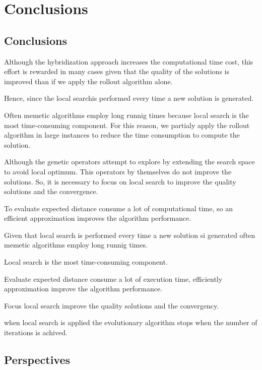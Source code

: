 \chapter{Conclusions}
\label{chap:conclusions}

\section{Conclusions}

Although the hybridization approach increases the computational time cost, this effort is rewarded in many cases given that the quality of the solutions is improved than if we apply the rollout algorithm alone. 

Hence, since the local searchis performed every time a new solution is generated.

Often memetic algorithms employ long runnig times because local search is the most time-consuming component. For this reason, we partialy apply the rollout algorithm in large instances to reduce the time consumption to compute the solution.

Although the genetic operators attempt to explore by extending the search space to avoid local optimum. This operators by themselves do not improve the solutions. So, it is necessary to focus on local search to improve the quality solutions and the convergence.

To evaluate expected distance consume a lot of computational time, so an efficient approximation improves the algorithm performance.

Given that local search is performed every time a new solution si generated often memetic algorithms employ long runnig times. 

Local search is the most time-consuming component.

Evaluate expected distance consume a lot of execution time, efficiently approximation improve the algorithm performance.

Focus local search improve the quality solutions and the convergency.

when local search is applied the evolutionary algorithm stops when the number of iterations is achived.

\section{Perspectives}

